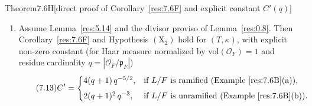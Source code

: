 \documentclass[12pt,letterpaper]{amsart}
\theoremstyle{plain}
\theoremstyle{definition}
\theoremstyle{remark}
\theoremstyle{definition}
\newcommand{\OF}{\mathcal{O}_F}
\begin{document}
\begin{res}{Theorem}{7.6H}[direct proof of Corollary~\ref{res:7.6F} and explicit constant $C'(q)$]
\begin{enumerate}[{\upshape(a)}]
$\xi_1=x_1+y_1\sqrt{d_\zeta}$ ($x_1,y_1\in F$), we have for
$\alpha(X)=\sqrt{d_\alpha}\,u$, $\zeta(X)=\sqrt{d_\zeta}\,v$ ($u,v\in F^\times$):
\[
\Phi_E|_{u_0}=\frac{uv}{8}\bigl(2uv\,t+d_\zeta v^2-3d_\alpha u^2\bigr)(t+\delta_L),
\qquad
\omega_{K/L}(\Phi_E|_{u_0})=\bigl(t^2-d_\alpha d_\zeta,\,d_\alpha\bigr)_F,
\]
and
\[
\omega_{E_{\emptyset,\alpha,\delta}(u_0)}
=\pm\frac{uv}{2}\,dt\wedge\frac{ds}{s^2-d_\zeta}\wedge\frac{dx_1\wedge dy_1}{y_1^2}.
\]
\item Assume Lemma~\ref{res:5.14} and the divisor proviso of Lemma~\ref{res:0.8}.
Then Corollary~\ref{res:7.6F} and Hypothesis $(\mathrm X_2)$ hold for $(T,\kappa)$,
with explicit non-zero constant (for Haar measure normalized by $\mathrm{vol}(\OF)=1$
and residue cardinality $q=|\OF/\mathfrak p_F|$)
\begin{equation}\tag{7.13}\label{eq:7.13}
C'=\begin{cases}
4(q+1)\,q^{-5/2}, & \text{if $L/F$ is ramified (Example~\ref{res:7.6B}(a))},\\[4pt]
2(q+1)^2\,q^{-3}, & \text{if $L/F$ is unramified (Example~\ref{res:7.6B}(b))}.
\end{cases}
\end{equation}
\end{enumerate}
\end{res}
\end{document}
